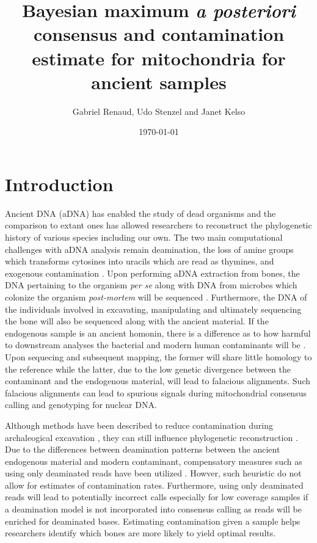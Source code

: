 \documentclass[a4paper,12pt]{article}
\begin{document}


\title{Bayesian maximum {\it a posteriori} consensus and contamination estimate for mitochondria for ancient samples }
\date{\today}
\author{Gabriel Renaud, Udo Stenzel and Janet Kelso}


\maketitle

\section{Introduction}

Ancient DNA (aDNA) has enabled the study of dead organisms and the comparison to extant ones has allowed researchers to reconstruct the phylogenetic history of various species including our own. The two main computational challenges with aDNA analysis remain deamination, the loss of amine groups which transforms cytosines into uracils which are read as thymines, and exogenous contamination \cite{kay?}. Upon performing aDNA extraction from bones, the DNA pertaining to the organism {\it per se} along with DNA from microbes which colonize the organism {\it post-mortem} will be sequenced \cite{susanna?}. Furthermore, the DNA of the individuals involved in excavating, manipulating and ultimately sequencing the bone will also be sequenced along with the ancient material. If the endogenous sample is an ancient homonin, there is a difference as to how harmful to downstream analyses the bacterial and modern human contaminants will be . Upon sequecing and subsequent mapping, the former will share little homology to the reference while the latter, due to the low genetic divergence between the contaminant and the endogenous material, will lead to falacious alignments. Such falacious alignments can lead to spurious signals during mitochondrial consensus calling and genotyping for nuclear DNA. 

Although methods have been described to reduce contamination during archaleogical excavation \cite{yang2005contamination}, they can still influence phylogenetic reconstruction \cite{wall2007inconsistencies}. Due to the differences between deamination patterns between the ancient endogenous material and modern contaminant, compensatory measures such as using only deaminated reads have been utilized \cite{pontus}. Howver, such heuristic do not allow for estimates of contamination rates. Furthermore, using only deaminated reads will lead to potentially incorrect calls especially for low coverage samples if a deamination model is not incorporated into consensus calling as reads will be enriched for deaminated bases. Estimating contamination given a sample helps researchers identify which bones are more likely to yield optimal results. 
\end{document}
